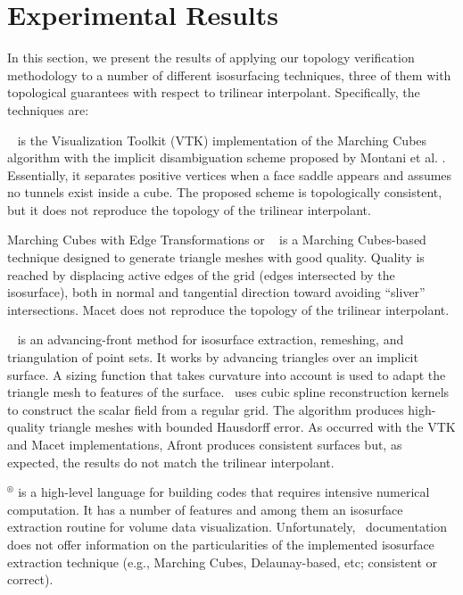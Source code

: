 \section{Experimental Results}
\label{sec:results}

In this section, we present the results of applying our topology verification
methodology to a number of different isosurfacing techniques, 
three of them with topological guarantees with respect to trilinear interpolant.
Specifically, the techniques are:

\vtk\ \cite{vtk} is the Visualization Toolkit (VTK) implementation of the
Marching Cubes algorithm with the
implicit disambiguation scheme proposed by Montani et al.
\cite{Montani:1994:MLT}. Essentially, it separates positive vertices when a
face saddle appears and assumes no tunnels exist inside a cube. The
proposed scheme is topologically consistent, but it does not reproduce the
topology of the trilinear interpolant. 

Marching Cubes with Edge Transformations or \macet\ \cite{Dietrich:TVCG:2008} is
a Marching Cubes-based technique designed to generate triangle 
meshes with good quality. 
Quality is reached by displacing active edges of the grid (edges intersected by the
isosurface), both in normal and tangential direction toward avoiding ``sliver'' intersections. 
Macet does not reproduce the topology of the trilinear interpolant.

\afront~\cite{Schreiner06} is an advancing-front method for isosurface
extraction, remeshing, and triangulation of point sets. It works by advancing
triangles over an implicit surface. A sizing function that takes curvature into account
is used to adapt the triangle mesh to features of the
surface. \afront\ uses cubic spline reconstruction kernels to
construct the scalar field from a regular grid.
The algorithm produces high-quality triangle meshes with bounded
Hausdorff error. As occurred with the VTK and Macet implementations, Afront produces consistent
surfaces but, as expected, the results do not match the trilinear
interpolant.

\matlab$^\circledR$ \cite{matlab10} is a high-level language for building codes that requires intensive
numerical computation. It has a number of features and among them an isosurface extraction routine for volume data
visualization. Unfortunately, \matlab\ documentation does not offer information
on the particularities of the implemented isosurface extraction technique (e.g., Marching Cubes, Delaunay-based, etc; consistent or correct).

